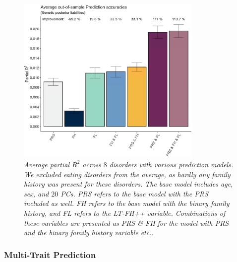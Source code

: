 \begin{figure}[h]
	\centering
	\includegraphics[width=0.8\textwidth]{results/avg_partial_prediciton_accuracies_noED.png}
	\caption[Average out-of-sample prediction across $ 8 $ disorders]{
		\sl Average partial $ R^2 $ across $ 8 $ disorders with various prediction models. We excluded eating disorders from the average, as hardly any family history was present for these disorders. The base model includes age, sex, and $ 20 $ PCs. \textit{PRS} refers to the base model with the PRS included as well. \textit{FH} refers to the base model with the binary family history, and \textit{FL} refers to the LT-FH++ variable. Combinations of these variables are presented as \textit{PRS} \& \textit{FH} for the model with PRS and the binary family history variable etc..}
	\label{fig:paper3:predictionResults}
\end{figure}

\subsubsection{Multi-Trait Prediction}


